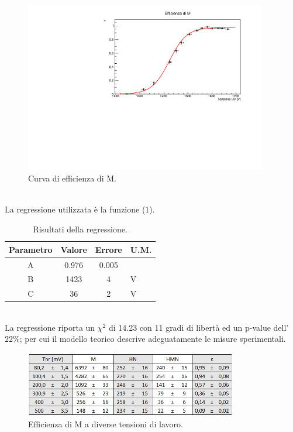 \documentclass[11pt]{article} %
\begin{document}
\begin{figure}[!ht]
\begin{center}
\includegraphics[width=400px]{img/chart_M.pdf}
\caption{Curva di efficienza di M.}
\label{fig:chart_M}
\end{center}
\end{figure}
\\La regressione utilizzata è la funzione (1). 
\begin{table}[!h]
\begin{center}
\begin{tabular}{|c|c|c|l|}
\hline
\multicolumn{1}{|l|}{Parametro} & \multicolumn{1}{l|}{Valore} & \multicolumn{1}{l|}{Errore} & U.M. \\ \hline
A                               & 0.976                       & 0.005                       &      \\ \hline
B                               & 1423                        & 4                           & V    \\ \hline
C                               & 36                          & 2                           & V    \\ \hline
\end{tabular}
\end{center}
\caption{Risultati della regressione.}
\end{table}
\\La regressione riporta un $\chi ^2$ di 14.23 con 11 gradi di libertà ed un p-value dell'$22\%$; per cui il modello teorico descrive adeguatamente le misure sperimentali.
\begin{figure}[!h]
\begin{center}
\includegraphics[width=350px]{img/thres_M.png}
\caption{Efficienza di M a diverse tensioni di lavoro.}
\label{fig:thres_H}
\end{center}
\end{figure}
\end{document}

